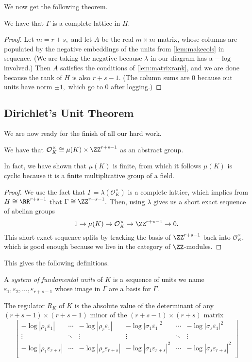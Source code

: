 We now get the following theorem.
\begin{theorem}
    We have that $\Gamma$ is a complete lattice in $H.$
\end{theorem}
\begin{proof}
    Let $m=r+s,$ and let $A$ be the real $m\times m$ matrix, whose columns are populated by the negative embeddings of the units from \autoref{lem:makecols} in sequence. (We are taking the negative because $\lambda$ in our diagram has a $-\log$ involved.) Then $A$ satisfies the conditions of \autoref{lem:matrixrank}, and we are done because the rank of $H$ is also $r+s-1.$ (The column sums are $0$ because out units have norm $\pm1,$ which go to $0$ after logging.)
\end{proof}

\subsection{Dirichlet's Unit Theorem}
We are now ready for the finish of all our hard work.
\begin{theorem}
    We have that $\mathcal O_K^\times\cong\mu(K)\times\ZZ^{r+s-1}$ as an abstract group.
\end{theorem}
\begin{remark}
    In fact, we have shown that $\mu(K)$ is finite, from which it follows $\mu(K)$ is cyclic because it is a finite multiplicative group of a field.
\end{remark}
\begin{proof}
    We use the fact that $\Gamma=\lambda(\mathcal O_K^\times)$ is a complete lattice, which implies from $H\cong\RR^{r+s-1}$ that $\Gamma\cong\ZZ^{r+s-1}.$ Then, using $\lambda$ gives us a short exact sequence of abelian groups
    \[1\to\mu(K)\to\mathcal O_K^\times\to\ZZ^{r+s-1}\to0.\]
    This short exact sequence splits by tracking the basis of $\ZZ^{r+s-1}$ back into $\mathcal O_K^\times,$ which is good enough because we live in the category of $\ZZ$-modules.
\end{proof}
This gives the following definitions.
\begin{definition}
    A \textit{system of fundamental units} of $K$ is a sequence of units we name $\varepsilon_1,\varepsilon_2,\ldots,\varepsilon_{r+s-1}$ whose image in $\Gamma$ are a basis for $\Gamma.$
\end{definition}
\begin{definition}[Regulator]
    The regulator $R_K$ of $K$ is the absolute value of the determinant of any $(r+s-1)\times(r+s-1)$ minor of the $(r+s-1)\times(r+s)$ matrix
    \[\begin{bmatrix}
        -\log|\rho_1\varepsilon_1| & \cdots & -\log|\rho_r\varepsilon_1| & -\log|\sigma_1\varepsilon_1|^2 & \cdots & -\log|\sigma_s\varepsilon_1|^2 \\
        \vdots & \ddots & \vdots & \vdots & \ddots & \vdots \\
        -\log|\rho_1\varepsilon_{r+s}| & \cdots & -\log|\rho_r\varepsilon_{r+s}| & -\log|\sigma_1\varepsilon_{r+s}|^2 & \cdots & -\log|\sigma_s\varepsilon_{r+s}|^2 \\
    \end{bmatrix}\]
\end{definition}
